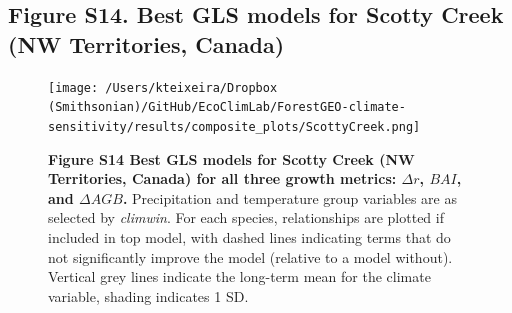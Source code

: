 \documentclass[
]{article}
\begin{document}
\hypertarget{figure-s14.-best-gls-models-for-scotty-creek-nw-territories-canada}{%
\subsection{Figure S14. Best GLS models for Scotty Creek (NW
Territories,
Canada)}\label{figure-s14.-best-gls-models-for-scotty-creek-nw-territories-canada}}

\begin{figure}
\centering
\texttt{[image: /Users/kteixeira/Dropbox (Smithsonian)/GitHub/EcoClimLab/ForestGEO-climate-sensitivity/results/composite\_plots/ScottyCreek.png]}
\caption{\textbf{Figure S14 \textbar{} Best GLS models for Scotty Creek
(NW Territories, Canada) for all three growth metrics: \(\Delta r\),
\(BAI\), and \(\Delta AGB\).} Precipitation and temperature group
variables are as selected by \emph{climwin}. For each species,
relationships are plotted if included in top model, with dashed lines
indicating terms that do not significantly improve the model (relative
to a model without). Vertical grey lines indicate the long-term mean for
the climate variable, shading indicates 1 SD.}
\end{figure}
\end{document}
